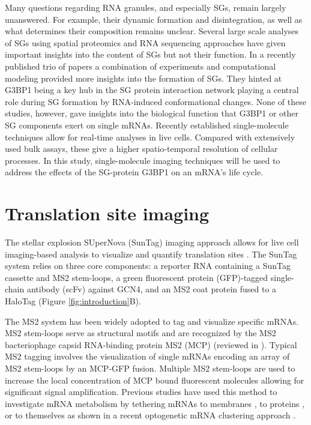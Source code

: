 Many questions regarding RNA granules, and especially SGs, remain largely unanswered.
For example, their dynamic formation and disintegration, as well as what determines their composition remains unclear.
Several large scale analyses of SGs using spatial proteomics \cite{markmiller_context-dependent_2018, jain_atpase-modulated_2016, youn_high-density_2018} and RNA sequencing \cite{khong_isolation_2018} approaches have given important insights into the content of SGs but not their function.
In a recently published trio of papers \cite{guillen-boixet_rna-induced_2020, sanders_competing_2020, yang_g3bp1_2020} a combination of experiments and computational modeling provided more insights into the formation of SGs.
They hinted at G3BP1 being a key hub in the SG protein interaction network playing a central role during SG formation by RNA-induced conformational changes.
None of these studies, however, gave insights into the biological function that G3BP1 or other SG components exert on single mRNAs.
Recently established single-molecule techniques allow for real-time analyses in live cells.
Compared with extensively used bulk assays, these give a higher spatio-temporal resolution of cellular processes.
In this study, single-molecule imaging techniques will be used to address the effects of the SG-protein G3BP1 on an mRNA's life cycle.

    
\section{Translation site imaging} \label{translation_site_imaging}

The stellar explosion SUperNova (SunTag) imaging approach allows for live cell imaging-based analysis to visualize and quantify translation sites \cite{tanenbaum_protein-tagging_2014}.
The SunTag system relies on three core components: a reporter RNA containing a SunTag cassette and MS2 stem-loops, a green fluorescent protein (GFP)-tagged single-chain antibody (scFv) against GCN4, and an MS2 coat protein fused to a HaloTag (Figure \ref{fig:introduction}B).

The MS2 system has been widely adopted to tag and visualize specific mRNAs.
MS2 stem-loops serve as structural motifs and are recognized by the MS2 bacteriophage capsid RNA-binding protein MS2 (MCP) (reviewed in \cite{george_intracellular_2018}).
Typical MS2 tagging involves the visualization of single mRNAs encoding an array of MS2 stem-loops by an MCP-GFP fusion.
Multiple MS2 stem-loops are used to increase the local concentration of MCP bound fluorescent molecules allowing for significant signal amplification.
Previous studies have used this method to investigate mRNA metabolism by tethering mRNAs to membranes \cite{genz_association_2013}, to proteins \cite{bos_tethered_2016}, or to themselves as shown in a recent optogenetic mRNA clustering approach \cite{kim_optogenetic_2020}.

